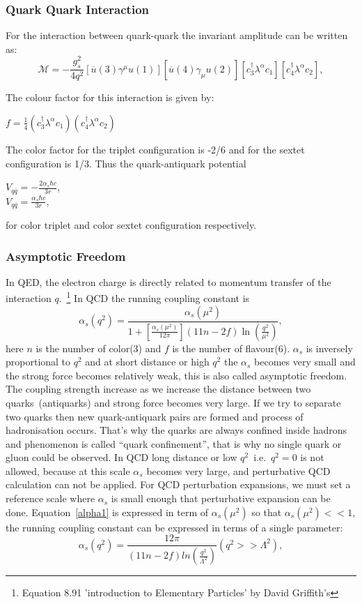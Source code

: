 \subsubsection{Quark Quark Interaction}
For the interaction between quark-quark the invariant amplitude can be written as:
\begin{equation}
\mathcal{M}=-\frac{g_{s}^{2}}{4q^{2}}[\overline{u}(3)\gamma^{\mu}u(1)][\overline{u}(4)\gamma_{\mu}u(2)][c_{3}^{\dagger}\lambda^{\alpha}c_{1}][c_{4}^{\dagger}\lambda^{\alpha}c_{2}],
\end{equation}

The colour factor for this interaction is given by:
\begin{center}
$f=\frac{1}{4}(c_{3}^{\dagger}\lambda^{\alpha}c_{1})(c_{4}^{\dagger}\lambda^{\alpha}c_{2})$
\end{center}
The color factor for the triplet configuration is -2/6 and for the sextet configuration is 1/3. Thus the quark-antiquark potential
\begin{center}
$V_{q\overline{q}}=-\frac{2\alpha_{s}\hbar c}{3r}$,\\
$V_{q\overline{q}}=\frac{\alpha_{s}\hbar c}{3r}$,
\end{center}
for color triplet and color sextet configuration respectively. 

\subsubsection{Asymptotic Freedom}
In QED, the electron charge is directly related to momentum transfer of the interaction $q$.~\footnote{Equation 8.91 'introduction to Elementary Particles' by David Griffith's }
In QCD the running coupling constant is
\begin{equation}\label{alpha1}
\alpha_{s}(q^{2})=\frac{\alpha_{s}(\mu^{2})}{1+[\frac{\alpha_{s}(\mu^{2})}{12\pi}](11n-2f)\ln(\frac{q^{2}}{\mu^{2}})},
\end{equation}
here $n$ is the number of color(3) and $f$ is the number of flavour(6). $\alpha_{s}$ is inversely proportional to $q^{2}$ and at short distance or high $q^{2}$ the $\alpha_{s}$ becomes very small and the strong force becomes relatively weak, this is also called asymptotic freedom.
The coupling strength increase as we increase the distance between two
quarks~(antiquarks) and strong force becomes very large. If we try to
separate two quarks then new quark-antiquark pairs are formed and process
of hadronisation occurs. That's why the quarks are always confined inside hadrons and phenomenon is called “quark confinement”, that is why no single quark or gluon could be observed.
In QCD long distance or low $q^{2}$~i.e.~$q^{2}=0$ is not allowed, because at this scale $\alpha_{s}$ becomes very large, and perturbative QCD calculation can not be applied. For QCD perturbation expansions, we must set a reference scale where $\alpha_{s}$ is small enough that perturbative expansion can be done. Equation~\ref{alpha1} is expressed in term of $\alpha_{s}(\mu^{2})$ so that  $\alpha_{s}(\mu^{2})<< 1$, the running coupling constant can be expressed in terms of a
single parameter:
\begin{equation}
\alpha_{s}(q^{2})=\frac{12\pi}{(11n-2f)ln(\frac{q^{2}}{\Lambda^{2}})}  (q^{2}>>\Lambda^{2}),
\end{equation}
